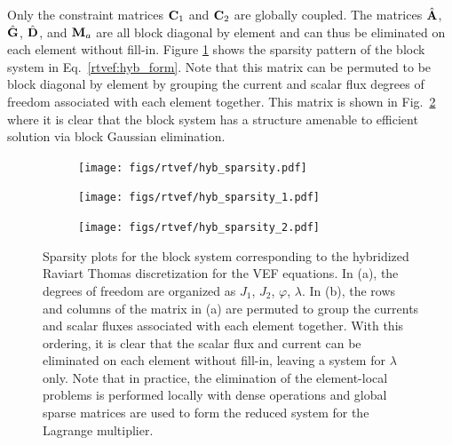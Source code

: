 \documentclass[../doc.tex]{subfiles}
\begin{document}
Only the constraint matrices $\boldsymbol{\mathrm{C}}_1$ and $\boldsymbol{\mathrm{C}}_2$ are globally coupled. The matrices $\hat{\boldsymbol{\mathrm{A}}}$, $\hat{\boldsymbol{\mathrm{G}}}$, $\hat{\boldsymbol{\mathrm{D}}}$, and $\boldsymbol{\mathrm{M}}_a$ are all block diagonal by element and can thus be eliminated on each element without fill-in. Figure \ref{fig:hyb_sparsity_a} shows the sparsity pattern of the block system in Eq.~\ref{rtvef:hyb_form}. Note that this matrix can be permuted to be block diagonal by element by grouping the current and scalar flux degrees of freedom associated with each element together. This matrix is shown in Fig.~\ref{fig:hyb_sparsity_b} where it is clear that the block system has a structure amenable to efficient solution via block Gaussian elimination. 
\begin{figure}
	\centering
	\begin{subfigure}{.49\textwidth}
		\centering
		\texttt{[image: figs/rtvef/hyb\_sparsity.pdf]}
		\caption{}
		\label{fig:hyb_sparsity_a}
	\end{subfigure}
	\begin{subfigure}{.49\textwidth}
		\centering
		\texttt{[image: figs/rtvef/hyb\_sparsity\_1.pdf]}
		\caption{}
		\label{fig:hyb_sparsity_b}
	\end{subfigure}
	\begin{subfigure}{.49\textwidth}
		\centering
		\texttt{[image: figs/rtvef/hyb\_sparsity\_2.pdf]}
		\caption{}
		\label{fig:hyb_sparsity_c}
	\end{subfigure}	
	\caption{Sparsity plots for the block system corresponding to the hybridized Raviart Thomas discretization for the VEF equations. In (a), the degrees of freedom are organized as $J_1$, $J_2$, $\varphi$, $\lambda$. In (b), the rows and columns of the matrix in (a) are permuted to group the currents and scalar fluxes associated with each element together. With this ordering, it is clear that the scalar flux and current can be eliminated on each element without fill-in, leaving a system for $\lambda$ only. Note that in practice, the elimination of the element-local problems is performed locally with dense operations and global sparse matrices are used to form the reduced system for the Lagrange multiplier. }
	\label{fig:hyb_sparsity}
\end{figure}
\end{document}
